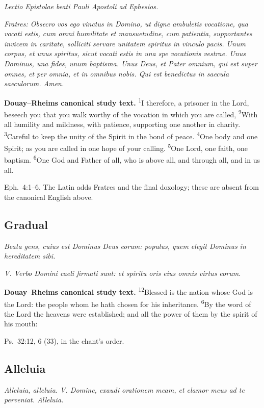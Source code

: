 \textit{Lectio Epistolae beati Pauli Apostoli ad Ephesios.}

\textit{Fratres: Obsecro vos ego vinctus in Domino, ut digne ambuletis vocatione, qua vocati estis, cum omni humilitate et mansuetudine, cum patientia, supportantes invicem in caritate, solliciti servare unitatem spiritus in vinculo pacis. Unum corpus, et unus spiritus, sicut vocati estis in una spe vocationis vestrae. Unus Dominus, una fides, unum baptisma. Unus Deus, et Pater omnium, qui est super omnes, et per omnia, et in omnibus nobis. Qui est benedictus in saecula saeculorum. Amen.}

\textbf{Douay--Rheims canonical study text.} \textsuperscript{1}I therefore, a prisoner in the Lord, beseech you that you walk worthy of the vocation in which you are called, \textsuperscript{2}With all humility and mildness, with patience, supporting one another in charity. \textsuperscript{3}Careful to keep the unity of the Spirit in the bond of peace. \textsuperscript{4}One body and one Spirit; as you are called in one hope of your calling. \textsuperscript{5}One Lord, one faith, one baptism. \textsuperscript{6}One God and Father of all, who is above all, and through all, and in us all.

Eph.~4:1--6. The Latin adds Fratres and the final doxology; these are absent from the canonical English above.

\subsection{Gradual}\label{proper-gradual}

\textit{Beata gens, cuius est Dominus Deus eorum: populus, quem elegit Dominus in hereditatem sibi.}

\textit{V. Verbo Domini caeli firmati sunt: et spiritu oris eius omnis virtus eorum.}

\textbf{Douay--Rheims canonical study text.} \textsuperscript{12}Blessed is the nation whose God is the Lord: the people whom he hath chosen for his inheritance. \textsuperscript{6}By the word of the Lord the heavens were established; and all the power of them by the spirit of his mouth:

Ps.~32:12, 6 (33), in the chant’s order.

\subsection{Alleluia}\label{proper-alleluia}

\textit{Alleluia, alleluia. V. Domine, exaudi orationem meam, et clamor meus ad te perveniat. Alleluia.}

